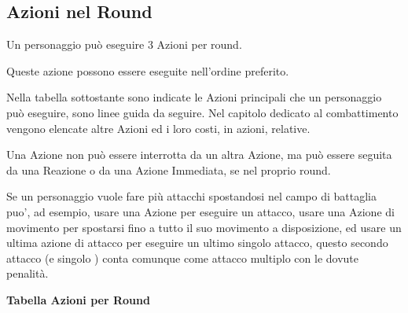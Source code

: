 \documentclass[a4paper,11pt,twoside,openany]{book}
\begin{document}
\subsection{Azioni nel Round}

\label{azioni-nel-round}

Un personaggio può eseguire 3 Azioni per round.

Queste azione possono essere eseguite nell'ordine preferito.

Nella tabella sottostante sono indicate le Azioni principali che un personaggio può eseguire, sono linee guida da seguire. Nel capitolo dedicato al combattimento vengono elencate altre Azioni ed i loro costi, in azioni, relative.

Una Azione non può essere interrotta da un altra Azione, ma può essere seguita da una Reazione o da una Azione Immediata, se nel proprio round.

Se un personaggio vuole fare più attacchi spostandosi nel campo di battaglia puo', ad esempio, usare una Azione per eseguire un attacco, usare una Azione di movimento per spostarsi fino a tutto il suo movimento a disposizione, ed usare un ultima azione di attacco per eseguire un ultimo singolo attacco, questo secondo attacco (e singolo ) conta comunque come attacco multiplo con le dovute penalità.

\medskip

\textbf{Tabella Azioni per Round}

\medskip
\end{document}
